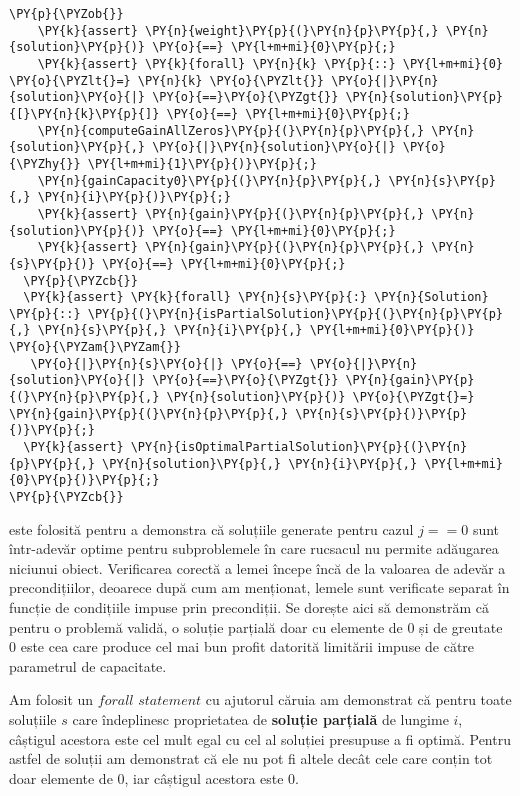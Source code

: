 \begin{sloppypar}
\begin{enumerate}
\begin{Verbatim}[commandchars=\\\{\}]
  \PY{p}{\PYZob{}}
    \PY{k}{assert} \PY{n}{weight}\PY{p}{(}\PY{n}{p}\PY{p}{,} \PY{n}{solution}\PY{p}{)} \PY{o}{==} \PY{l+m+mi}{0}\PY{p}{;}
    \PY{k}{assert} \PY{k}{forall} \PY{n}{k} \PY{p}{::} \PY{l+m+mi}{0} \PY{o}{\PYZlt{}=} \PY{n}{k} \PY{o}{\PYZlt{}} \PY{o}{|}\PY{n}{solution}\PY{o}{|} \PY{o}{==}\PY{o}{\PYZgt{}} \PY{n}{solution}\PY{p}{[}\PY{n}{k}\PY{p}{]} \PY{o}{==} \PY{l+m+mi}{0}\PY{p}{;}
    \PY{n}{computeGainAllZeros}\PY{p}{(}\PY{n}{p}\PY{p}{,} \PY{n}{solution}\PY{p}{,} \PY{o}{|}\PY{n}{solution}\PY{o}{|} \PY{o}{\PYZhy{}} \PY{l+m+mi}{1}\PY{p}{)}\PY{p}{;}
    \PY{n}{gainCapacity0}\PY{p}{(}\PY{n}{p}\PY{p}{,} \PY{n}{s}\PY{p}{,} \PY{n}{i}\PY{p}{)}\PY{p}{;}
    \PY{k}{assert} \PY{n}{gain}\PY{p}{(}\PY{n}{p}\PY{p}{,} \PY{n}{solution}\PY{p}{)} \PY{o}{==} \PY{l+m+mi}{0}\PY{p}{;}
    \PY{k}{assert} \PY{n}{gain}\PY{p}{(}\PY{n}{p}\PY{p}{,} \PY{n}{s}\PY{p}{)} \PY{o}{==} \PY{l+m+mi}{0}\PY{p}{;}
  \PY{p}{\PYZcb{}}
  \PY{k}{assert} \PY{k}{forall} \PY{n}{s}\PY{p}{:} \PY{n}{Solution} \PY{p}{::} \PY{p}{(}\PY{n}{isPartialSolution}\PY{p}{(}\PY{n}{p}\PY{p}{,} \PY{n}{s}\PY{p}{,} \PY{n}{i}\PY{p}{,} \PY{l+m+mi}{0}\PY{p}{)} \PY{o}{\PYZam{}\PYZam{}} 
   \PY{o}{|}\PY{n}{s}\PY{o}{|} \PY{o}{==} \PY{o}{|}\PY{n}{solution}\PY{o}{|} \PY{o}{==}\PY{o}{\PYZgt{}} \PY{n}{gain}\PY{p}{(}\PY{n}{p}\PY{p}{,} \PY{n}{solution}\PY{p}{)} \PY{o}{\PYZgt{}=} \PY{n}{gain}\PY{p}{(}\PY{n}{p}\PY{p}{,} \PY{n}{s}\PY{p}{)}\PY{p}{)}\PY{p}{;}
  \PY{k}{assert} \PY{n}{isOptimalPartialSolution}\PY{p}{(}\PY{n}{p}\PY{p}{,} \PY{n}{solution}\PY{p}{,} \PY{n}{i}\PY{p}{,} \PY{l+m+mi}{0}\PY{p}{)}\PY{p}{;}
\PY{p}{\PYZcb{}}
\end{Verbatim}
    este folosită pentru a demonstra că soluțiile generate pentru cazul $j == 0$ sunt într-adevăr optime pentru subproblemele în care rucsacul nu permite adăugarea niciunui obiect. Verificarea corectă a lemei începe încă de la valoarea de adevăr a precondițiilor, deoarece după cum am menționat, lemele sunt verificate separat în funcție de condițiile impuse prin precondiții. Se dorește aici să demonstrăm că pentru o problemă validă, o soluție parțială doar cu elemente de 0 și de greutate 0 este cea care produce cel mai bun profit datorită limitării impuse de către parametrul de capacitate. \par
    \hspace{2mm} Am folosit un $forall$ $statement$ cu ajutorul căruia am demonstrat că pentru toate soluțiile $s$ care îndeplinesc proprietatea de \textbf{soluție parțială} de lungime $i$, câștigul acestora este cel mult egal cu cel al soluției presupuse a fi optimă. Pentru astfel de soluții am demonstrat că ele nu pot fi altele decât cele care conțin tot doar elemente de 0, iar câștigul acestora este 0.

\end{enumerate}
\end{sloppypar}
